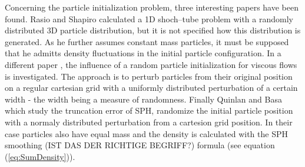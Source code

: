 \documentclass{report}
\begin{document}
 Concerning the particle initialization problem, three interesting papers have been found. Rasio and Shapiro \cite{Rassi1991} calculated a 1D shoch--tube problem with a randomly distributed 3D particle distribution, but it is not specified how this distribution is generated. As he further assumes constant mass particles, it must be supposed that he admitts density fluctuations in the initial particle configuration.          
 In a different paper \cite{Graham2007}, the influence of a random particle initialization for viscous flows is investigated. The approach is to perturb particles from their original position on a regular cartesian grid with a uniformly distributed perturbation of a certain width - the width being a measure of randomness.                                                                                                         
 Finally Quinlan and Basa \cite{Quinlan2006} which study the truncation error of SPH, randomize the initial particle position with a normaly distributed perturbation from a cartesion grid position. In their case particles also have equal mass and the density is calculated with the SPH smoothing (IST DAS DER RICHTIGE BEGRIFF?) formula (see equation (\ref{eq:SumDensity})).                                                       
                                                                                                                                              
\end{document}
